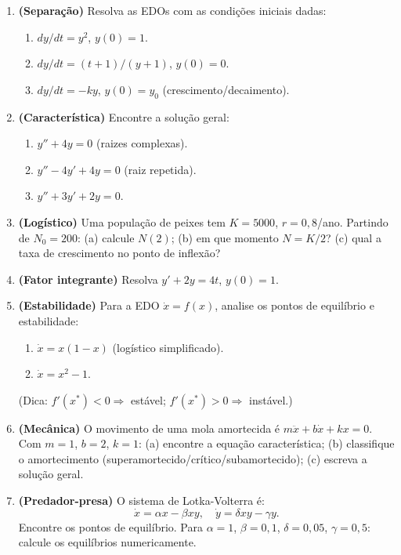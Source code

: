 \documentclass[12pt,a4paper]{article}
\begin{document}
\begin{enumerate}
  \item \textbf{(Separa\c{c}\~ao)} Resolva as EDOs com as condi\c{c}\~oes iniciais dadas:
    \begin{enumerate}
      \item[$a.$] $dy/dt = y^2$, $y(0)=1$.
      \item[$b.$] $dy/dt = (t+1)/(y+1)$, $y(0)=0$.
      \item[$c.$] $dy/dt = -ky$, $y(0)=y_0$ (crescimento/decaimento).
    \end{enumerate}
  
  \item \textbf{(Caracter\'istica)} Encontre a solu\c{c}\~ao geral:
    \begin{enumerate}
      \item[$a.$] $y'' + 4y = 0$ (raizes complexas).
      \item[$b.$] $y'' - 4y' + 4y = 0$ (raiz repetida).
      \item[$c.$] $y'' + 3y' + 2y = 0$.
    \end{enumerate}
  
  \item \textbf{(Log\'istico)} Uma popula\c{c}\~ao de peixes tem $K=5000$, $r=0{,}8$/ano. Partindo de $N_0=200$: (a) calcule $N(2)$; (b) em que momento $N = K/2$? (c) qual a taxa de crescimento no ponto de inflex\~ao?
  
  \item \textbf{(Fator integrante)} Resolva $y' + 2y = 4t$, $y(0)=1$.
  
  \item \textbf{(Estabilidade)} Para a EDO $\dot x = f(x)$, analise os pontos de equil\'ibrio e estabilidade:
    \begin{enumerate}
      \item[$a.$] $\dot x = x(1-x)$ (log\'istico simplificado).
      \item[$b.$] $\dot x = x^2 - 1$.
    \end{enumerate}
    (Dica: $f'(x^*) < 0 \Rightarrow$ est\'avel; $f'(x^*)>0 \Rightarrow$ inst\'avel.)
  
  \item \textbf{(Mec\^anica)} O movimento de uma mola amortecida \'e $m\ddot x + b\dot x + kx = 0$. Com $m=1$, $b=2$, $k=1$: (a) encontre a equa\c{c}\~ao caracter\'istica; (b) classifique o amortecimento (superamortecido/cr\'itico/subamortecido); (c) escreva a solu\c{c}\~ao geral.
  
  \item \textbf{(Predador-presa)} O sistema de Lotka-Volterra \'e:
    \[
    \dot x = \alpha x - \beta xy, \quad \dot y = \delta xy - \gamma y.
    \]
    Encontre os pontos de equil\'ibrio. Para $\alpha=1$, $\beta=0{,}1$, $\delta=0{,}05$, $\gamma=0{,}5$: calcule os equil\'ibrios numericamente.
\end{enumerate}
\end{document}
